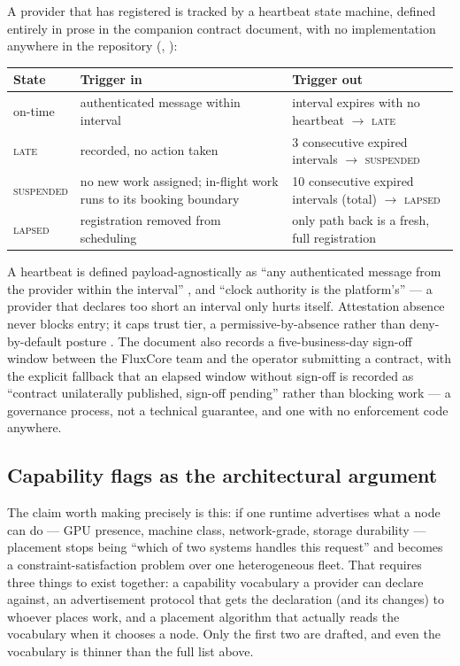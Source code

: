 A provider that has registered is tracked by a heartbeat state machine, defined entirely in prose in
the companion contract document, with no implementation anywhere in the repository
(\inprogress, ):

\begin{center}
\begin{tabular}{lll}
\toprule
State & Trigger in & Trigger out \\
\midrule
on-time & authenticated message within interval & interval expires with no heartbeat $\to$ \textsc{late} \\
\textsc{late} & recorded, no action taken & 3 consecutive expired intervals $\to$ \textsc{suspended} \\
\textsc{suspended} & no new work assigned; in-flight work runs to its booking boundary & 10 consecutive
expired intervals (total) $\to$ \textsc{lapsed} \\
\textsc{lapsed} & registration removed from scheduling & only path back is a fresh, full registration \\
\bottomrule
\end{tabular}
\end{center}

A heartbeat is defined payload-agnostically as ``any authenticated message from the provider within
the interval'' , and ``clock authority is the
platform's''  — a provider that declares too short
an interval only hurts itself. Attestation absence never blocks entry; it caps trust tier, a
permissive-by-absence rather than deny-by-default posture .
The document also records a five-business-day sign-off window between the FluxCore team and the
operator submitting a contract, with the explicit fallback that an elapsed window without sign-off is
recorded as ``contract unilaterally published, sign-off pending'' rather than blocking work
 — a governance process, not a technical
guarantee, and one with no enforcement code anywhere.

\subsection{Capability flags as the architectural argument}

The claim worth making precisely is this: if one runtime advertises what a node can do — GPU
presence, machine class, network-grade, storage durability — placement stops being ``which of two
systems handles this request'' and becomes a constraint-satisfaction problem over one heterogeneous
fleet. That requires three things to exist together: a capability vocabulary a provider can declare
against, an advertisement protocol that gets the declaration (and its changes) to whoever places
work, and a placement algorithm that actually reads the vocabulary when it chooses a node. Only the
first two are drafted, and even the vocabulary is thinner than the full list above.

